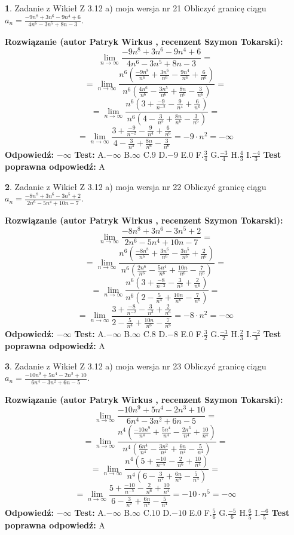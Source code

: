 \documentclass[12pt, a4paper]{article}
\theoremstyle{definition} %
\newtheorem{zad}{}
\newcommand{\zadStart}[1]{\begin{zad}#1\newline}
\newcommand{\zadStop}{\end{zad}}
\newcommand{\rozwStart}[2]{\noindent \textbf{Rozwiązanie (autor #1 , recenzent #2): }\newline}
\newcommand{\rozwStop}{\newline}
\newcommand{\odpStart}{\noindent \textbf{Odpowiedź:}\newline}
\newcommand{\odpStop}{\newline}
\newcommand{\testStart}{\noindent \textbf{Test:}\newline}
\newcommand{\testStop}{\newline}
\newcommand{\kluczStart}{\noindent \textbf{Test poprawna odpowiedź:}\newline}
\newcommand{\kluczStop}{\newline}
\begin{document}
\zadStart{Zadanie z Wikieł Z 3.12 a) moja wersja nr 21}
Obliczyć granicę ciągu $a_{n}=\frac{-9n^{8}+3n^{6}-9n^{4}+6}{4n^{6}-3n^{5}+8n-3}$.
\zadStop
\rozwStart{Patryk Wirkus}{Szymon Tokarski}
$$\lim\limits_{n\to\infty}\frac{-9n^{8}+3n^{6}-9n^{4}+6}{4n^{6}-3n^{5}+8n-3}=$$
$$=\lim\limits_{n\to\infty}\frac{n^{6}\left(\frac{-9n^{8}}{n^{6}}+\frac{3n^{6}}{n^{6}}-\frac{9n^{4}}{n^{6}}+\frac{6}{n^{6}}\right)}{n^{6}\left(\frac{4n^{6}}{n^{6}}-\frac{3n^{5}}{n^{6}}+\frac{8n}{n^{6}}-\frac{3}{n^{6}}\right)}=$$
$$=\lim\limits_{n\to\infty}\frac{n^{6}\left(3+\frac{-9}{n^{-2}}-\frac{9}{n^{4}}+\frac{6}{n^{6}}\right)}
{n^{6}\left(4-\frac{3}{n^{3}}+\frac{8n}{n^{6}}-\frac{3}{n^{6}}\right)}=$$
$$=\lim\limits_{n\to\infty}\frac{3+\frac{-9}{n^{-2}}-\frac{9}{n^{4}}+\frac{6}{n^{6}}}{4-\frac{3}{n^{3}}+\frac{8n}{n^{6}}-\frac{3}{n^{6}}}=-9\cdot n^{2} = -\infty$$
\rozwStop
\odpStart
$-\infty$
\odpStop
\testStart
A.$-\infty$
B.$\infty$
C.$9$
D.$-9$
E.$0$
F.$\frac{3}{4}$
G.$\frac{-3}{4}$
H.$\frac{4}{3}$
I.$\frac{-4}{3}$
\testStop
\kluczStart
A
\kluczStop



\zadStart{Zadanie z Wikieł Z 3.12 a) moja wersja nr 22}
Obliczyć granicę ciągu $a_{n}=\frac{-8n^{8}+3n^{6}-3n^{5}+2}{2n^{6}-5n^{4}+10n-7}$.
\zadStop
\rozwStart{Patryk Wirkus}{Szymon Tokarski}
$$\lim\limits_{n\to\infty}\frac{-8n^{8}+3n^{6}-3n^{5}+2}{2n^{6}-5n^{4}+10n-7}=$$
$$=\lim\limits_{n\to\infty}\frac{n^{6}\left(\frac{-8n^{8}}{n^{6}}+\frac{3n^{6}}{n^{6}}-\frac{3n^{5}}{n^{6}}+\frac{2}{n^{6}}\right)}{n^{6}\left(\frac{2n^{6}}{n^{6}}-\frac{5n^{4}}{n^{6}}+\frac{10n}{n^{6}}-\frac{7}{n^{6}}\right)}=$$
$$=\lim\limits_{n\to\infty}\frac{n^{6}\left(3+\frac{-8}{n^{-2}}-\frac{3}{n^{3}}+\frac{2}{n^{6}}\right)}
{n^{6}\left(2-\frac{5}{n^{4}}+\frac{10n}{n^{6}}-\frac{7}{n^{6}}\right)}=$$
$$=\lim\limits_{n\to\infty}\frac{3+\frac{-8}{n^{-2}}-\frac{3}{n^{3}}+\frac{2}{n^{6}}}{2-\frac{5}{n^{4}}+\frac{10n}{n^{6}}-\frac{7}{n^{6}}}=-8\cdot n^{2} = -\infty$$
\rozwStop
\odpStart
$-\infty$
\odpStop
\testStart
A.$-\infty$
B.$\infty$
C.$8$
D.$-8$
E.$0$
F.$\frac{3}{2}$
G.$\frac{-3}{2}$
H.$\frac{2}{3}$
I.$\frac{-2}{3}$
\testStop
\kluczStart
A
\kluczStop



\zadStart{Zadanie z Wikieł Z 3.12 a) moja wersja nr 23}
Obliczyć granicę ciągu $a_{n}=\frac{-10n^{9}+5n^{4}-2n^{3}+10}{6n^{4}-3n^{2}+6n-5}$.
\zadStop
\rozwStart{Patryk Wirkus}{Szymon Tokarski}
$$\lim\limits_{n\to\infty}\frac{-10n^{9}+5n^{4}-2n^{3}+10}{6n^{4}-3n^{2}+6n-5}=$$
$$=\lim\limits_{n\to\infty}\frac{n^{4}\left(\frac{-10n^{9}}{n^{4}}+\frac{5n^{4}}{n^{4}}-\frac{2n^{3}}{n^{4}}+\frac{10}{n^{4}}\right)}{n^{4}\left(\frac{6n^{4}}{n^{4}}-\frac{3n^{2}}{n^{4}}+\frac{6n}{n^{4}}-\frac{5}{n^{4}}\right)}=$$
$$=\lim\limits_{n\to\infty}\frac{n^{4}\left(5+\frac{-10}{n^{-5}}-\frac{2}{n^{6}}+\frac{10}{n^{4}}\right)}
{n^{4}\left(6-\frac{3}{n^{7}}+\frac{6n}{n^{4}}-\frac{5}{n^{4}}\right)}=$$
$$=\lim\limits_{n\to\infty}\frac{5+\frac{-10}{n^{-5}}-\frac{2}{n^{6}}+\frac{10}{n^{4}}}{6-\frac{3}{n^{7}}+\frac{6n}{n^{4}}-\frac{5}{n^{4}}}=-10\cdot n^{5} = -\infty$$
\rozwStop
\odpStart
$-\infty$
\odpStop
\testStart
A.$-\infty$
B.$\infty$
C.$10$
D.$-10$
E.$0$
F.$\frac{5}{6}$
G.$\frac{-5}{6}$
H.$\frac{6}{5}$
I.$\frac{-6}{5}$
\testStop
\kluczStart
A
\kluczStop
\end{document}
